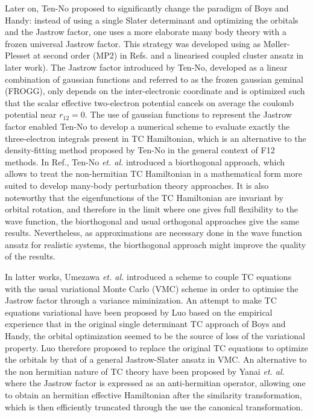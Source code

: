 \documentclass[aip,jcp,reprint,noshowkeys,superscriptaddress]{revtex4-1}
\begin{document}
Later on, Ten-No\cite{TenNo-CPL-00-a} proposed to significantly change the paradigm of Boys and Handy: instead of using a single Slater determinant and optimizing the orbitals and the Jastrow factor, one uses a more elaborate many body theory with a frozen universal Jastrow factor.  This strategy was developed using as M{\o}ller-Plesset at second order (MP2) in Refs. and a linearised coupled cluster ansatz in later work\cite{HinTanTen-CPL-02}).  
The Jastrow factor introduced by Ten-No, developed as a linear combination of gaussian functions and referred to as the frozen gaussian geminal (FROGG), only depends on the inter-electronic coordinate and is optimized such that the scalar effective two-electron  potential cancels on average the coulomb potential near $r_{12}=0$. The use of gaussian functions to represent the Jastrow factor enabled Ten-No to develop a numerical scheme to evaluate exactly the three-electron integrals present in TC Hamiltonian\cite{TenNo-CPL-00-b}, which is an alternative to the density-fitting method proposed by Ten-No in the general context of F12 methods\cite{TenMan-JCP-03}. 
In Ref., Ten-No \textit{et. al.} introduced a biorthogonal approach, 
which allows to treat the non-hermitian TC Hamiltonian in a mathematical form more suited 
to develop many-body perturbation theory approaches. 
It is also noteworthy that the eigenfunctions of the TC Hamiltonian are invariant by orbital rotation, 
and therefore in the limit where one gives full flexibility to the wave function, 
the biorthogonal and usual orthogonal approaches give the same results. 
Nevertheless, as approximations are necessary done in the wave function ansatz for realistic systems, 
the biorthogonal approach might improve the quality of the results. 

In latter works, Umezawa \textit{et. al.}\cite{UmeTsu-JCP-03,UmeTsuOhnShiChi-JCP-05} introduced a scheme to couple TC equations with the usual variational Monte Carlo (VMC) scheme in order to optimise the Jastrow factor through a variance miminization. 
An attempt to make TC equations variational have been proposed by Luo\cite{Luo-JCP-10,Luo-JCP-11} based on the empirical experience that in the original single determinant TC approach of Boys and Handy, the orbital optimization seemed to be the source of loss of the variational property. Luo therefore proposed to replace the original TC equations to optimize the orbitals by that of a general Jastrow-Slater ansatz in VMC. 
An alternative to the non hermitian nature of TC theory have been proposed by Yanai \textit{et. al.}\cite{YanShi-JCP-12}  where the Jastrow factor is expressed as an anti-hermitian operator, allowing one to obtain an hermitian effective Hamiltonian after the similarity transformation, which is then efficiently truncated through the use the canonical transformation\cite{NeuYanCha-MolPhys-10}. 
\end{document}
